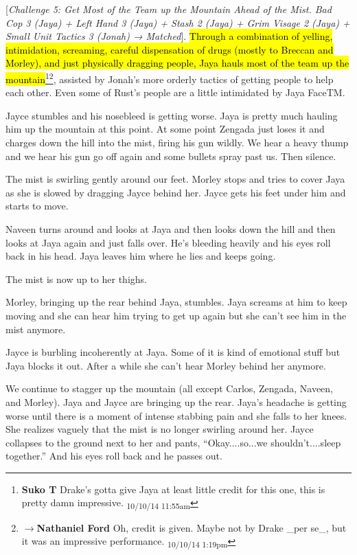 {[}\textit{Challenge 5: Get Most of the Team up the Mountain Ahead of the Mist.  Bad Cop 3 (Jaya) + Left Hand 3 (Jaya) + Stash 2 (Jaya) + Grim Visage 2 (Jaya) + Small Unit Tactics 3 (Jonah) → Matched}{]}.  \hl{Through a combination of yelling, intimidation, screaming, careful dispensation of drugs (mostly to Breccan and Morley), and just physically dragging people, Jaya hauls most of the team up the mountain}\footnote{\textbf{Suko T }Drake's gotta give Jaya at least little credit for this one, this is pretty damn impressive. \textsubscript{10/10/14 11:55am}}\footnote{$\rightarrow$\textbf{Nathaniel Ford }Oh, credit is given. Maybe not by Drake \_per se\_, but it was an impressive performance. \textsubscript{10/10/14 1:19pm}}, assisted by Jonah's more orderly tactics of getting people to help each other.  Even some of Rust's people are a little intimidated by Jaya FaceTM.



Jayce stumbles and his nosebleed is getting worse.  Jaya is pretty much hauling him up the mountain at this point.   At some point Zengada just loses it and charges down the hill into the mist, firing his gun wildly.  We hear a heavy thump and we hear his gun go off again and some bullets spray past us. Then silence.  

The mist is swirling gently around our feet.  Morley stops and tries to cover Jaya as she is slowed by dragging Jayce behind her.  Jayce gets his feet under him and starts to move. 

Naveen turns around and looks at Jaya and then looks down the hill and then looks at Jaya again and just falls over.  He's bleeding heavily and his eyes roll back in his head.  Jaya leaves him where he lies and keeps going.

The mist is now up to her thighs.  

Morley, bringing up the rear behind Jaya, stumbles.  Jaya screams at him to keep moving and she can hear him trying to get up again but she can't see him in the mist anymore.  

Jayce is burbling incoherently at Jaya. Some of it is kind of emotional stuff but Jaya blocks it out.  After a while she can't hear Morley behind her anymore.



We continue to stagger up the mountain (all except Carlos, Zengada, Naveen, and Morley).  Jaya and Jayce are bringing up the rear.  Jaya's headache is getting worse until there is a moment of intense stabbing pain and she falls to her knees.  She realizes vaguely that the mist is no longer swirling around her.  Jayce collapses to the ground next to her and pants, ``Okay....so...we shouldn't....sleep together.''  And his eyes roll back and he passes out.

